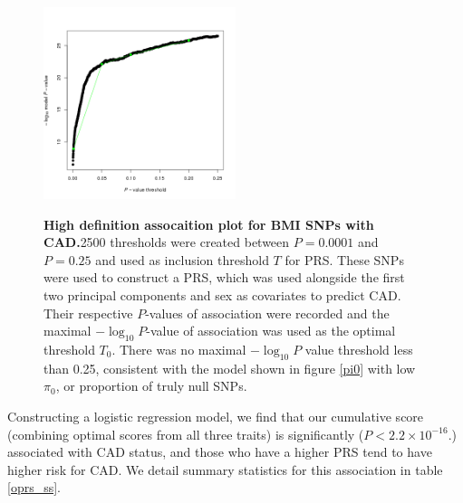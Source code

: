 \begin{figure}[H]
\centering
\includegraphics[width=0.5\textwidth]{Figures/PRSice_HIGH-RES_PLOT_2016-04-23.png}
\label{oprs_bmi}
\caption[Optimal $P$-value inclusion threshold for \ac{BMI}.]{\textbf{High definition assocaition plot for \ac{BMI} \acp{SNP} with \ac{CAD}.}2500 thresholds were created between $P = 0.0001$ and $P = 0.25$ and used as inclusion threshold $T$ for \ac{PRS}. These \acp{SNP} were used to construct a \ac{PRS}, which was used alongside the first two principal components and sex as covariates to predict \ac{CAD}. Their respective $P$-values of association were recorded and the maximal $-\log_{10} P$-value of association was used as the optimal threshold $T_0$. There was no maximal $-\log_{10} P$ value threshold less than 0.25, consistent with the model shown in figure \ref{pi0} with low $\pi_0$, or proportion of truly null \acp{SNP}.}
\end{figure}

Constructing a logistic regression model, we find that our cumulative score (combining optimal scores from all three traits) is significantly ($P < 2.2 \times 10^{-16}$.) associated with \ac{CAD} status, and those who have a higher \ac{PRS} tend to have higher risk for \ac{CAD}. We detail summary statistics for this association in table \ref{oprs_ss}. 



